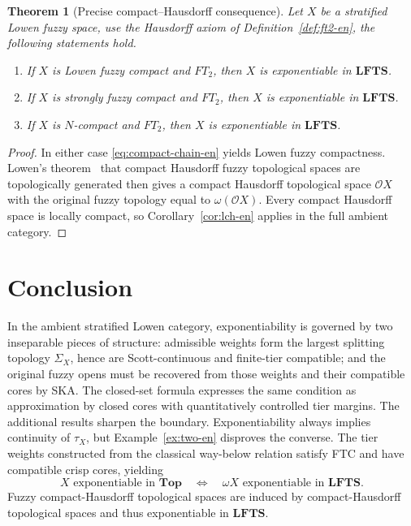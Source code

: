 \documentclass[11pt,a4paper]{article}
\numberwithin{equation}{section}
\newtheorem{theorem}{Theorem}[section]
\theoremstyle{definition}
\theoremstyle{remark}
\newcommand{\LFTS}{\mathbf{LFTS}}
\begin{document}
\begin{theorem}[Precise compact--Hausdorff consequence]
\label{thm:compact-ft2-en}
Let \(X\) be a stratified Lowen fuzzy space, use the Hausdorff axiom of
Definition~\ref{def:ft2-en}, the following statements hold.
\begin{enumerate}[label=(\roman*)]
 \item If \(X\) is Lowen fuzzy compact and \(FT_2\), then \(X\) is
 exponentiable in \(\LFTS\).
 \item If \(X\) is strongly fuzzy compact and \(FT_2\), then \(X\) is
 exponentiable in \(\LFTS\).
 \item If \(X\) is \(N\)-compact and \(FT_2\), then \(X\) is exponentiable in
 \(\LFTS\).
\end{enumerate}
\end{theorem}

\begin{proof}
In either case \eqref{eq:compact-chain-en} yields Lowen fuzzy
compactness. Lowen's theorem~\cite{Lowen1981-en} that compact Hausdorff fuzzy topological
spaces are topologically generated then gives a compact Hausdorff
topological space \(\mathcal OX\) with the original fuzzy topology
equal to \(\omega(\mathcal OX)\).  Every compact Hausdorff space is
locally compact, so Corollary~\ref{cor:lch-en} applies in the full ambient
category.
\end{proof}

\section{Conclusion}

In the ambient stratified Lowen category, exponentiability is governed
by two inseparable pieces of structure: admissible weights form the
largest splitting topology \(\Sigma_X\), hence are Scott-continuous and
finite-tier compatible; and the original fuzzy opens must be recovered
from those weights and their compatible cores by SKA.  The closed-set
formula expresses the same condition as approximation by closed cores
with quantitatively controlled tier margins.
The additional results sharpen the boundary.  Exponentiability always
implies continuity of \(\tau_X\), but Example~\ref{ex:two-en} disproves
the converse.  The tier weights constructed from the classical
way-below relation satisfy FTC and have compatible crisp cores, yielding
\[
 X\text{ exponentiable in }\mathbf{Top}
 \quad\Longleftrightarrow\quad
 \omega X\text{ exponentiable in }\LFTS.
\]
Fuzzy compact-Hausdorff topological spaces are induced by compact-Hausdorff topological spaces and thus exponentiable in \(\LFTS\).
\end{document}
